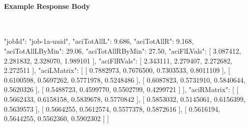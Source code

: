 \paragraph{Example Response Body} \mbox{}\\[\jsoncodeheaderspace]
\begin{jsoncode}
{
  "jobId": "job-1a-uuid",
  "aciTotAllL": 9.686,
  "aciTotAllR": 9.168,
  "aciTotAllLByMin": 29.06,
  "aciTotAllRByMin": 27.50,
  "aciFlLVals": [
    3.087412,
    2.281832,
    2.328070,
    1.989101
  ],
  "aciFlRVals": [
    2.343111,
    2.279407,
    2.272682,
    2.272511
  ],
  "aciLMatrix": [
    [ 0.7882973, 0.7676500, 0.7303533, 0.8011109 ],
    [ 0.6100598, 0.5697262, 0.5771978, 0.5248486 ],
    [ 0.6087823, 0.5731910, 0.5840644, 0.5620326 ],
    [ 0.5488723, 0.4599770, 0.5502799, 0.4299721 ]
  ],
  "aciRMatrix": [
    [ 0.5662433, 0.6158158, 0.5839678, 0.5770842 ],
    [ 0.5853032, 0.5145061, 0.6156399, 0.5639573 ],
    [ 0.5664255, 0.5612574, 0.5577378, 0.5872616 ],
    [ 0.5616194, 0.5644255, 0.5562360, 0.5902302 ]
  ]
}
\end{jsoncode}
